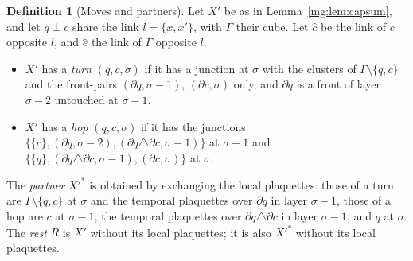 \documentclass[11pt,a4paper]{article}
\theoremstyle{definition}
\newtheorem{definition}[theorem]{Definition}
\theoremstyle{remark}
\begin{document}
\begin{definition}[Moves and partners]\label{mg:def:partner}
Let $X'$ be as in Lemma~\ref{mg:lem:capsum}, and let $q\perp c$ share the link $l=\{x,x'\}$, with $\Gamma$ their cube. Let $\hat c$ be the link of $c$ opposite
$l$, and $\hat e$ the link of $\Gamma$ opposite $l$.
\begin{itemize}
\item $X'$ has a \emph{turn} $(q,c,\sigma)$ if it has a junction at $\sigma$ with the clusters of $\Gamma\setminus\{q,c\}$ and the front-pairs $(\partial q,\sigma-1)$,
$(\partial c,\sigma)$ only, and $\partial q$ is a front of layer $\sigma-2$ untouched at $\sigma-1$.
\item $X'$ has a \emph{hop} $(q,c,\sigma)$ if it has the junctions $\{\{c\},(\partial q,\sigma-2),(\partial q\triangle\partial c,\sigma-1)\}$ at $\sigma-1$ and
$\{\{q\},(\partial q\triangle\partial c,\sigma-1),(\partial c,\sigma)\}$ at $\sigma$.
\end{itemize}
The \emph{partner} $X'^*$ is obtained by exchanging the local plaquettes: those of a turn are $\Gamma\setminus\{q,c\}$ at $\sigma$ and the temporal plaquettes over
$\partial q$ in layer $\sigma-1$, those of a hop are $c$ at $\sigma-1$, the temporal plaquettes over $\partial q\triangle\partial c$ in layer $\sigma-1$, and $q$ at $\sigma$. The
\emph{rest} $R$ is $X'$ without its local plaquettes; it is also $X'^*$ without its local plaquettes.
\end{definition}
\end{document}
